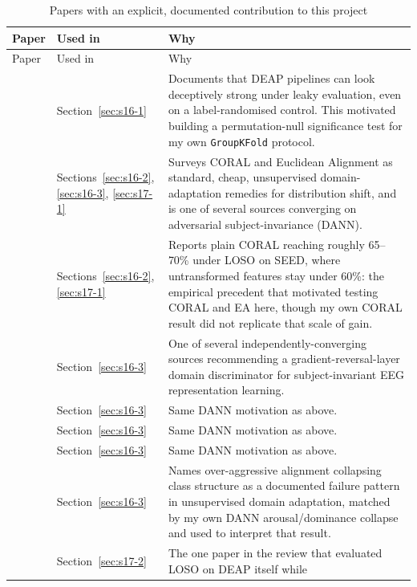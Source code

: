 \documentclass[11pt]{report}
\begin{document}
\begin{longtable}{p{3.4cm}p{2.4cm}p{6.8cm}}
\caption{Papers with an explicit, documented contribution to this project}
\label{tab:papers-cited} \\
\toprule
Paper & Used in & Why \\
\midrule
\endfirsthead
\toprule
Paper & Used in & Why \\
\midrule
\endhead
\citet{khan_ndreviewfailures} &
Section~\ref{sec:s16-1} &
Documents that DEAP pipelines can look deceptively strong under leaky
evaluation, even on a label-randomised control. This motivated building a
permutation-null significance test for my own \texttt{GroupKFold} protocol. \\
\addlinespace
\citet{sarafraz2022domain} &
Sections~\ref{sec:s16-2}, \ref{sec:s16-3}, \ref{sec:s17-1} &
Surveys CORAL and Euclidean Alignment as standard, cheap, unsupervised
domain-adaptation remedies for distribution shift, and is one of several
sources converging on adversarial subject-invariance (DANN). \\
\addlinespace
\citet{ye2024dsagc} &
Sections~\ref{sec:s16-2}, \ref{sec:s17-1} &
Reports plain CORAL reaching roughly 65--70\% under LOSO on SEED, where
untransformed features stay under 60\%: the empirical precedent that
motivated testing CORAL and EA here, though my own CORAL result did not
replicate that scale of gain. \\
\addlinespace
\citet{zhang2022parse} &
Section~\ref{sec:s16-3} &
One of several independently-converging sources recommending a
gradient-reversal-layer domain discriminator for subject-invariant EEG
representation learning. \\
\addlinespace
\citet{li2022tutorial} &
Section~\ref{sec:s16-3} &
Same DANN motivation as above. \\
\addlinespace
\citet{liu2024gnnsurvey} &
Section~\ref{sec:s16-3} &
Same DANN motivation as above. \\
\addlinespace
\citet{liu2026brainsci} &
Section~\ref{sec:s16-3} &
Same DANN motivation as above. \\
\addlinespace
\citet{sreehari2026review} &
Section~\ref{sec:s16-3} &
Names over-aggressive alignment collapsing class structure as a documented
failure pattern in unsupervised domain adaptation, matched by my own DANN
arousal/dominance collapse and used to interpret that result. \\
\addlinespace
\citet{wang2024cascaded} &
Section~\ref{sec:s17-2} &
The one paper in the review that evaluated LOSO on DEAP itself while

\end{longtable}
\end{document}
